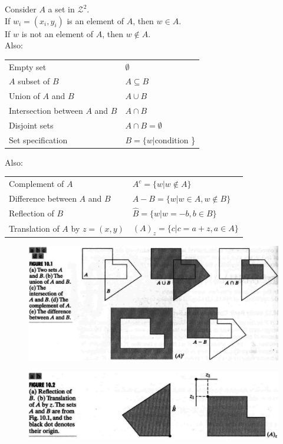 \begin{frame}
Consider $A$ a set in $\mathcal{Z}^{2}$.\\
If $w_{i} = (x_{i}, y_{i})$ is an element of $A$, then $w \in A$.\\
If $w$ is not an element of $A$, then $w \notin A$.\\
Also:\\
\begin{tabular}{|l|l|}
\hline 
Empty set & $\emptyset$ \\ 
$A$ subset of $B$ & $A \subseteq B$ \\ 
Union of $A$ and $B$ & $A \cup B$ \\ 
Intersection between $A$ and $B$ & $A \cap B$ \\
Disjoint sets & $A \cap B = \emptyset$ \\ 
Set specification & $B = \{ w | \text{condition}$ \} \\ 
\hline
\end{tabular} 
\end{frame}

\begin{frame}
Also:\\
\begin{tabular}{|l|l|}
\hline 
Complement of $A$ & $A^{c} = \{ w | w \notin A \}$\\
Difference between $A$ and $B$ & $A - B = \{ w | w \in A, w \notin B \}$ \\
Reflection of $B$ & $\hat{B} = \{ w | w = -b, b \in B \}$ \\
Translation of $A$ by $z = ( x, y )$ & $\left ( A \right )_{z} = \{ c | c = a + z, a \in A \}$ \\
\hline
\end{tabular} 
\end{frame}

\begin{frame}
\begin{figure}[!h]
\includegraphics[width=.8\textwidth]{fig-10-1}
\end{figure}
\begin{figure}[!h]
\includegraphics[width=.8\textwidth]{fig-10-2}
\end{figure}
\end{frame}

